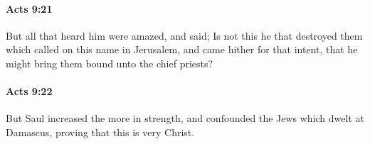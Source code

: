 		\paragraph{Acts 9:21} %
			\label{ACTS-9-21}

			But all that heard him were amazed, and said; Is not this he that destroyed them which called on this name in Jerusalem, and came hither for that intent, that he might bring them bound unto the chief priests?

			\begin{framed}
			\scriptsize
				\begin{compactdesc}
					\item[SBLG] 
				\end{compactdesc}
			\end{framed}

		\paragraph{Acts 9:22} %
			\label{ACTS-9-22}

			But Saul increased the more in strength, and confounded the Jews which dwelt at Damascus, proving that this is very Christ.

